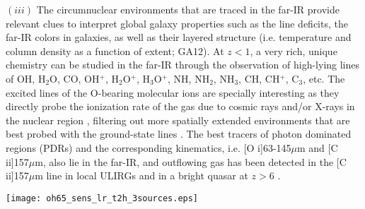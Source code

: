 \documentclass{pasa}%
\newcommand{\kms}{{\hbox {km\thinspace s$^{-1}$}}}
\begin{document}
$(iii)$ The circumnuclear environments that are traced in the far-IR provide
relevant clues to interpret global galaxy properties such as the 
line deficits, the far-IR colors in galaxies, as well as their layered
structure (i.e. temperature and column density as a function of extent;
GA12). At $z<1$, a very rich, unique chemistry can be studied in the far-IR 
through the observation of high-lying lines of OH, H$_2$O, CO, OH$^+$,
H$_2$O$^+$, H$_3$O$^+$, NH, NH$_2$, NH$_3$, CH, CH$^+$, C$_3$, etc. The
excited lines of the O-bearing molecular ions are specially interesting as
they directly probe the ionization rate of the gas due to cosmic rays and/or
X-rays in the nuclear region \citep{gon13}, filtering out more
spatially extended environments that are best probed with the ground-state
lines \citep{tak16}. The best tracers of photon dominated
regions (PDRs) and the corresponding kinematics, i.e. [O {\sc i}]63-145$\mu$m
and [C {\sc ii}]157$\mu$m, also lie in the far-IR, and outflowing gas has been
detected in the [C {\sc ii}]157$\mu$m line in local ULIRGs \citep{jan16} and
in a bright quasar at $z > 6$ \citep{mai12,cic15}.  





\begin{figure*}
\begin{center}
\texttt{[image: oh65\_sens\_lr\_t2h\_3sources.eps]}
\caption{
{\it Left}: Predicted integrated absorbing flux of the OH65 doublet in three
local ULIRGs (IRAS~03158+4227, Mrk~231, and IRAS~23365+3604, from $-1000$
\kms\ to 1000 \kms) as a function of redshift (red numbers) and observed
wavelength (abscissa). The black curve shows the expected sensitivity 
($1\sigma$) of {\it SPICA}/SAFARI LR ($R=300$) for 2 hours of observing time,
indicating that the doublet, probing buried stages, would be easily detected
in similar ULIRGs up to $z=1.9-2.5$. {\it Right}: The continuum-normalized
OH65 spectrum of Mrk~231 observed with {\it Herschel}/PACS smoothed to the
resolution of {\it SPICA}/SAFARI LR, with 2 spectral points per resolution
element. The three errorbars in each spectral channel indicate the $\pm\sigma$
uncertainty expected with SAFARI for 2 hours of observing time at the selected
redshifts of $z=1.0$, $1.5$, and $2.0$. The weak absortion around
$V\sim2000$ \kms\ is a blend of NH$_2$, $^{18}$OH, and H$_2$O$^+$ lines.} 
\label{oh65_lr}
\end{center}
\end{figure*}
\end{document}

